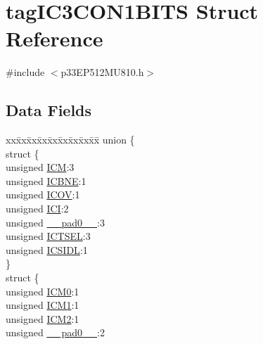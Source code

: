 \hypertarget{structtag_i_c3_c_o_n1_b_i_t_s}{}\section{tag\+I\+C3\+C\+O\+N1\+B\+I\+TS Struct Reference}
\label{structtag_i_c3_c_o_n1_b_i_t_s}


{\ttfamily \#include $<$p33\+E\+P512\+M\+U810.\+h$>$}

\subsection*{Data Fields}
\begin{DoxyCompactItemize}
\item 
\begin{tabbing}
xx\=xx\=xx\=xx\=xx\=xx\=xx\=xx\=xx\=\kill
union \{\\
\>struct \{\\
\>\>unsigned \hyperlink{structtag_i_c3_c_o_n1_b_i_t_s_ad3edde44ecb2d349ffa2decd0a251c20}{ICM}:3\\
\>\>unsigned \hyperlink{structtag_i_c3_c_o_n1_b_i_t_s_a824e7dcca83939e1b049d63ffcee33e9}{ICBNE}:1\\
\>\>unsigned \hyperlink{structtag_i_c3_c_o_n1_b_i_t_s_a49392949376ba0bf58cf8db889e86c94}{ICOV}:1\\
\>\>unsigned \hyperlink{structtag_i_c3_c_o_n1_b_i_t_s_a72486dcb868aad2d5c978494691356cc}{ICI}:2\\
\>\>unsigned \hyperlink{structtag_i_c3_c_o_n1_b_i_t_s_adf71f3d8410c1f1dbbc96680a92c49af}{\_\_pad0\_\_}:3\\
\>\>unsigned \hyperlink{structtag_i_c3_c_o_n1_b_i_t_s_a7a9dd41b5f93eb620df7fa336e452677}{ICTSEL}:3\\
\>\>unsigned \hyperlink{structtag_i_c3_c_o_n1_b_i_t_s_af441b36127c0bb7a35162dfc9a64103c}{ICSIDL}:1\\
\>\} \\
\>struct \{\\
\>\>unsigned \hyperlink{structtag_i_c3_c_o_n1_b_i_t_s_a649b1dd9bca75e558f37a9f52a829bd4}{ICM0}:1\\
\>\>unsigned \hyperlink{structtag_i_c3_c_o_n1_b_i_t_s_af3fe77ef9f8ca41ff11519f445e7bc77}{ICM1}:1\\
\>\>unsigned \hyperlink{structtag_i_c3_c_o_n1_b_i_t_s_a3c62c9cbbc3a406402126c932b709db8}{ICM2}:1\\
\>\>unsigned \hyperlink{structtag_i_c3_c_o_n1_b_i_t_s_adf71f3d8410c1f1dbbc96680a92c49af}{\_\_pad0\_\_}:2\\

\end{tabbing}
\end{DoxyCompactItemize}
